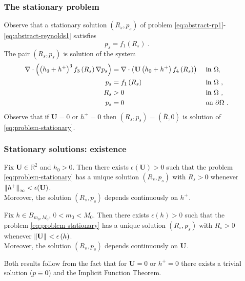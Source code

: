 \documentclass[10pt,aspectratio=169]{beamer}
\newenvironment{nalign}{
	\begin{equation}
	\begin{aligned}
}{
	\end{aligned}
	\end{equation}
	\ignorespacesafterend
}
\begin{document}
\begin{frame}
\frametitle{The stationary problem}

Observe that a stationary solution $(R_s,p_s)$ of problem \eqref{eq:abstract-rp1}-\eqref{eq:abstract-reynolds1} satisfies
\begin{equation*}
p_s=f_1\left(R_s\right)~.
\end{equation*}
The pair $(R_s,p_s)$ is solution of the system
\begin{nalign}
	\nabla\cdot \left(\left(h_0+h^+\right)^3f_3\left(R_s\right)\nabla p_s\right)&=\nabla\cdot\left(\mathbf{U}\left(h_0+h^+\right)f_4\left(R_s\right)\right)&&\textnormal{ in } \Omega,\\
	p_s&=f_1\left(R_s\right)&&\textnormal{ in } \Omega~,\\
	R_s&>0&&\textnormal{ in } \Omega~,\\
	p_s&=0&&\textnormal{ on }\partial \Omega~.
	\label{eq:problem-stationary}
\end{nalign}
Observe that if $\mathbf{U}=0$ or $h^+=0$ then $\left(R_s,p_s\right)=\left(\bar{R},0\right)$ is solution of \eqref{eq:problem-stationary}.

\end{frame} 


\begin{frame}
\frametitle{Stationary solutions: existence}
\begin{theorem}\label{theo:existence_U_fix}
	Fix $\mathbf{U}\in\mathbb{R}^2$ and $h_0>0$. Then there exists $\epsilon\left(\mathbf{U}\right)>0$ such that the problem \eqref{eq:problem-stationary} has a unique solution $\left(R_s,p_s\right)$ with $R_s>0$ whenever $\left\lVert h^+\right\rVert_{\infty}<\epsilon(\mathbf{U})$.\\ {\color{red}Moreover, the solution $\left(R_s,p_s\right)$ depends continuously on $h^+$}.
\end{theorem}
\begin{theorem}\label{theo:existence_h_fix}
	Fix $h\in B_{m_0,M_0}$, $0<m_0<M_0$. Then there exists $\epsilon\left(h\right)>0$ such that the problem \eqref{eq:problem-stationary} has a unique solution $\left(R_s,p_s\right)$ with $R_s>0$ whenever $\left\lVert\mathbf{U}\right\rVert_{}<\epsilon\left(h\right)$.\\  {\color{red}Moreover, the solution $\left(R_s,p_s\right)$ depends continuously on $\mathbf{U}$}.
\end{theorem}
\bigskip

Both results follow from the fact that for $\mathbf{U}=0$ or $h^+=0$ there exists a trivial solution ($p\equiv0$) and the Implicit Function Theorem.
\end{frame} 
\end{document}
